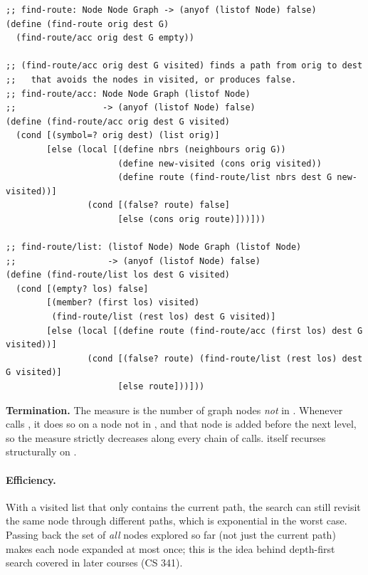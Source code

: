 \begin{lstlisting}[style=racket]
;; find-route: Node Node Graph -> (anyof (listof Node) false)
(define (find-route orig dest G)
  (find-route/acc orig dest G empty))

;; (find-route/acc orig dest G visited) finds a path from orig to dest
;;   that avoids the nodes in visited, or produces false.
;; find-route/acc: Node Node Graph (listof Node)
;;                 -> (anyof (listof Node) false)
(define (find-route/acc orig dest G visited)
  (cond [(symbol=? orig dest) (list orig)]
        [else (local [(define nbrs (neighbours orig G))
                      (define new-visited (cons orig visited))
                      (define route (find-route/list nbrs dest G new-visited))]
                (cond [(false? route) false]
                      [else (cons orig route)]))]))

;; find-route/list: (listof Node) Node Graph (listof Node)
;;                  -> (anyof (listof Node) false)
(define (find-route/list los dest G visited)
  (cond [(empty? los) false]
        [(member? (first los) visited)
         (find-route/list (rest los) dest G visited)]
        [else (local [(define route (find-route/acc (first los) dest G visited))]
                (cond [(false? route) (find-route/list (rest los) dest G visited)]
                      [else route]))]))
\end{lstlisting}

\begin{sloppypar}\noindent\textbf{Termination.} The measure is the number of graph nodes \emph{not} in
. Whenever  calls
, it does so on a node not in , and that node is added before the next
level, so the measure strictly decreases along every chain of calls.
 itself recurses structurally on .
\end{sloppypar}

\paragraph{Efficiency.} With a visited list that only contains the current
path, the search can still revisit the same node through different paths,
which is exponential in the worst case. Passing back the set of
\emph{all} nodes explored so far (not just the current path) makes each node
expanded at most once; this is the idea behind depth-first search covered in
later courses (CS 341).


